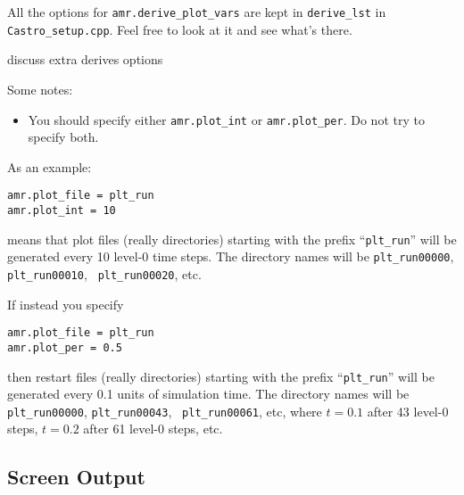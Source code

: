 All the options for {\tt amr.derive\_plot\_vars} are kept in
\texttt{derive\_lst} in {\tt Castro\_setup.cpp}.  Feel free to look at
it and see what's there.

{\color{red} discuss extra derives options}

Some notes:
\begin{itemize}

\item You should specify either {\tt amr.plot\_int} or
{\tt amr.plot\_per}.  Do not try to specify both. 
\end{itemize}


As an example:
\begin{lstlisting}
amr.plot_file = plt_run
amr.plot_int = 10
\end{lstlisting}
means that plot files (really directories) starting with the prefix
``{\tt plt\_run}'' will be generated every 10 level-0 time steps.  The
directory names will be {\tt plt\_run00000}, {\tt plt\_run00010}, {\tt
  plt\_run00020}, etc.


If instead you specify
\begin{lstlisting}
amr.plot_file = plt_run
amr.plot_per = 0.5
\end{lstlisting}
then restart files (really directories) starting with the prefix
``{\tt plt\_run}'' will be generated every 0.1 units of simulation time.  The
directory names will be {\tt plt\_run00000}, {\tt plt\_run00043}, {\tt
  plt\_run00061}, etc, where $t = 0.1$ after 43 level-0 steps, $t =
0.2$ after 61 level-0 steps, etc.



\subsection{Screen Output}

